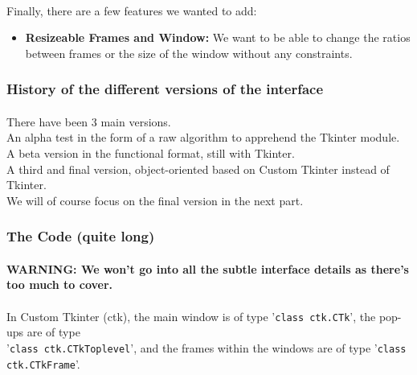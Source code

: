 \documentclass{article}
\newcommand{\code}[1]{\fontfamily{zi4}\texttt{#1}}
\begin{document}
\paragraph{}
Finally, there are a few features we wanted to add:

\begin{itemize}
  \item \textbf{Resizeable Frames and Window:} We want to be able to change the ratios between frames or the size of the window without any constraints.
\end{itemize}

\paragraph{}
\subsubsection{History of the different versions of the interface}
\paragraph{}

There have been 3 main versions. \\
An alpha test in the form of a raw algorithm to apprehend the Tkinter module.\\
A beta version in the functional format, still with Tkinter.\\
A third and final version, object-oriented based on Custom Tkinter instead of Tkinter. \\
We will of course focus on the final version in the next part.


\newpage
\subsubsection{The Code (quite long)}
\paragraph{}
\textbf{WARNING: We won't go into all the subtle interface details as there's too much to cover.}
\paragraph{}

In Custom Tkinter (ctk), the main window is of type '\code{class ctk.CTk}', the pop-ups are of type \\
'\code{class ctk.CTkToplevel}', and the frames within the windows are of type '\code{class ctk.CTkFrame}'. \\
\end{document}
